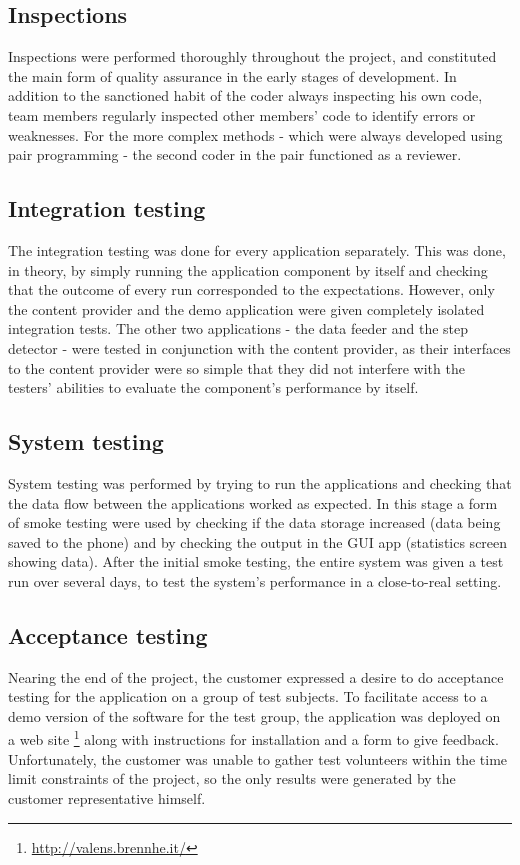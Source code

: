 \subsection{Inspections}
Inspections were performed thoroughly throughout the project, and constituted the main form of quality assurance in the early stages of development. In addition to the sanctioned habit of the coder always inspecting his own code, team members regularly inspected other members' code to identify errors or weaknesses. For the more complex methods - which were always developed using pair programming - the second coder in the pair functioned as a reviewer.
\subsection{Integration testing}
The integration testing was done for every application separately. This was done, in theory, by simply running the application component by itself and checking that the outcome of every run corresponded to the expectations. However, only the content provider and the demo application were given completely isolated integration tests. The other two applications - the data feeder and the step detector - were tested in conjunction with the content provider, as their interfaces to the content provider were so simple that they did not interfere with the testers' abilities to evaluate the component's performance by itself.
\subsection{System testing}
System testing was performed by trying to run the applications and checking that the data flow between the applications worked as expected. In this stage a form of smoke testing were used by checking if the data storage increased (data being saved to the phone) and by checking the output in the GUI app (statistics screen showing data). After the initial smoke testing, the entire system was given a test run over several days, to test the system's performance in a close-to-real setting. 

\subsection{Acceptance testing}
\label{def:accTesting}
Nearing the end of the project, the customer expressed a desire to do acceptance testing for the application on a group of test subjects. To facilitate access to a demo version of the software for the test group, the application was deployed on a web site \footnote{\url{http://valens.brennhe.it/}} along with instructions for installation and a form to give feedback. Unfortunately, the customer was unable to gather test volunteers within the time limit constraints of the project, so the only results were generated by the customer representative himself. 

